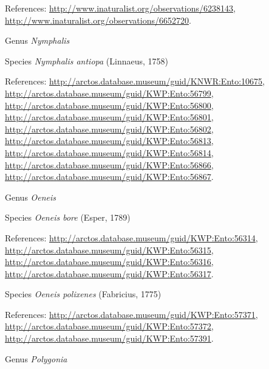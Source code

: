 \documentclass[9pt, article]{memoir}
\begin{document}
\begin{multicols}{2}
\vspace{6pt}References: 
\url{http://www.inaturalist.org/observations/6238143}, 
\url{http://www.inaturalist.org/observations/6652720}.

\vspace{6pt}\noindent\hspace{30pt}Genus \textit{Nymphalis}


\vspace{6pt}\noindent\hspace{36pt}Species \textit{Nymphalis antiopa} (Linnaeus, 1758)


\vspace{6pt}References: 
\url{http://arctos.database.museum/guid/KNWR:Ento:10675}, 
\url{http://arctos.database.museum/guid/KWP:Ento:56799}, 
\url{http://arctos.database.museum/guid/KWP:Ento:56800}, 
\url{http://arctos.database.museum/guid/KWP:Ento:56801}, 
\url{http://arctos.database.museum/guid/KWP:Ento:56802}, 
\url{http://arctos.database.museum/guid/KWP:Ento:56813}, 
\url{http://arctos.database.museum/guid/KWP:Ento:56814}, 
\url{http://arctos.database.museum/guid/KWP:Ento:56866}, 
\url{http://arctos.database.museum/guid/KWP:Ento:56867}.

\vspace{6pt}\noindent\hspace{30pt}Genus \textit{Oeneis}


\vspace{6pt}\noindent\hspace{36pt}Species \textit{Oeneis bore} (Esper, 1789)


\vspace{6pt}References: 
\url{http://arctos.database.museum/guid/KWP:Ento:56314}, 
\url{http://arctos.database.museum/guid/KWP:Ento:56315}, 
\url{http://arctos.database.museum/guid/KWP:Ento:56316}, 
\url{http://arctos.database.museum/guid/KWP:Ento:56317}.

\vspace{6pt}\noindent\hspace{36pt}Species \textit{Oeneis polixenes} (Fabricius, 1775)


\vspace{6pt}References: 
\url{http://arctos.database.museum/guid/KWP:Ento:57371}, 
\url{http://arctos.database.museum/guid/KWP:Ento:57372}, 
\url{http://arctos.database.museum/guid/KWP:Ento:57391}.

\vspace{6pt}\noindent\hspace{30pt}Genus \textit{Polygonia}



\end{multicols}
\end{document}
